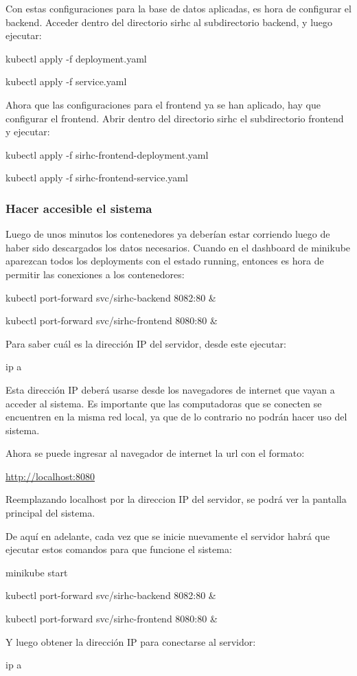\documentclass{article}
\begin{document}
Con estas configuraciones para la base de datos aplicadas, es hora de configurar el backend. Acceder dentro del directorio sirhc al subdirectorio backend, y luego ejecutar:

kubectl apply -f deployment.yaml

kubectl apply -f service.yaml

Ahora que las configuraciones para el frontend ya se han aplicado, hay que configurar el frontend. Abrir dentro del directorio sirhc el subdirectorio frontend y ejecutar:

kubectl apply -f sirhc-frontend-deployment.yaml

kubectl apply -f sirhc-frontend-service.yaml

\subsubsection{Hacer accesible el sistema}
Luego de unos minutos los contenedores ya deberían estar corriendo luego de haber sido descargados los datos necesarios. Cuando en el dashboard de minikube aparezcan todos los deployments con el estado running, entonces es hora de permitir las conexiones a los contenedores:

kubectl port-forward svc/sirhc-backend 8082:80 \&

kubectl port-forward svc/sirhc-frontend 8080:80 \&

Para saber cuál es la dirección IP del servidor, desde este ejecutar:

ip a

Esta dirección IP deberá usarse desde los navegadores de internet que vayan a acceder al sistema. Es importante que las computadoras que se conecten se encuentren en la misma red local, ya que de lo contrario no podrán hacer uso del sistema.

Ahora se puede ingresar al navegador de internet la url con el formato:

\href{http://localhost:8080}{http://localhost:8080}

Reemplazando localhost por la direccion IP del servidor, se podrá ver la pantalla principal del sistema.

De aquí en adelante, cada vez que se inicie nuevamente el servidor habrá que ejecutar estos comandos para que funcione el sistema:

minikube start

kubectl port-forward svc/sirhc-backend 8082:80 \&

kubectl port-forward svc/sirhc-frontend 8080:80 \&

Y luego obtener la dirección IP para conectarse al servidor:

ip a
\end{document}
